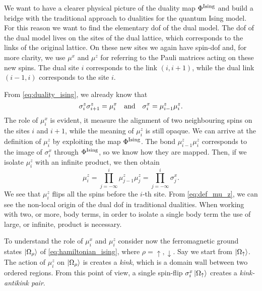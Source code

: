 \begin{figure}[t]
\end{figure}


We want to have a clearer physical picture of the duality map $\Phi^{\text{Ising}}$ and build a bridge with the traditional approach to dualities for the quantum Ising model.
For this reason we want to find the elementary \ac{dof} of the dual model.
The \ac{dof} of the dual model lives on the sites of the dual lattice, which corresponds to the links of the original lattice.
On these new sites we again have spin-\onehalf \ac{dof} and, for more clarity, we use $\mu^x$ and $\mu^z$ for referring to the Pauli matrices acting on these new spins.
The dual site $i$ corresponds to the link $(i, i+1)$, while the dual link $(i-1, i)$  corresponds to the site $i$.

From \eqref{eq:duality_ising}, we already know that
\begin{equation}
    \sigma^z_i \sigma^z_{i+1} = \mu^x_i
    \qand
    \sigma^x_i = \mu^z_{i-1} \mu^z_i.
\end{equation}
The role of $\mu^x_i$ is evident, it measure the alignment of two neighbouring spins on the sites $i$ and $i+1$, while the meaning of $\mu^z_i$ is still opaque.
We can arrive at the definition of $\mu^z_i$ by exploiting the map $\Phi^{\text{Ising}}$.
The bond $\mu^z_{i-1} \mu^z_i$ corresponds to the image of $\sigma^x_i$ through $\Phi^{\text{Ising}}$, so we know how they are mapped.
Then, if we isolate $\mu^z_i$ with an infinite product, we then obtain
\begin{equation}
    \mu^z_i
    = \prod_{j = -\infty}^{i} \mu^z_{j-1} \mu^z_j
    = \prod_{j = -\infty}^{i} \sigma^x_j.
    \label{eq:def_mu_z}
\end{equation}
We see that $\mu^z_i$ flips all the spins before the $i$-th site.
From \eqref{eq:def_mu_z}, we can see the non-local origin of the dual \ac{dof} in traditional dualities.
When working with two, or more, body terms, in order to isolate a single body term the use of large, or infinite, product is necessary.

To understand the role of $\mu^x_i$ and $\mu^z_i$ consider now the ferromagnetic ground states $\ket{\Omega_{\rho}}$ of \eqref{eq:hamiltonian_ising}, where $\rho=\uparrow, \downarrow$.
Say we start from $\ket{\Omega_{\uparrow}}$.
The action of $\mu^z_i$ on $\ket{\Omega_{\rho}}$ is creates a \emph{kink}, which is a domain wall between two ordered regions.
From this point of view, a single spin-flip $\sigma^x_i \ket{\Omega_{\uparrow}}$ creates a \emph{kink-antikink pair}.



